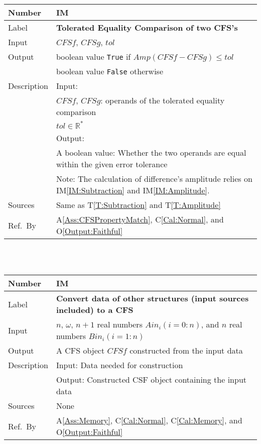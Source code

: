 \documentclass[12pt]{article}
\newcommand{\colAwidth}{0.13\textwidth}
\newcommand{\colBwidth}{0.82\textwidth}
\newcommand{\tref}[1]{T\ref{#1}}
\newcommand{\aref}[1]{A\ref{#1}}
\newcommand{\calref}[1]{C\ref{#1}}
\newcommand{\oref}[1]{O\ref{#1}}
\newcounter{instnum} %
\newcommand{\iref}[1]{IM\ref{#1}}
\begin{document}
\noindent
\begin{minipage}{\textwidth}
	\renewcommand*{\arraystretch}{1.5}
	\begin{tabular}{| p{\colAwidth} | p{\colBwidth}|}
		\hline
		\rowcolor[gray]{0.9}
		Number& IM{instnum}\theinstnum \label{IM:ToleratedEquality}\\
		\hline
		Label& \bf Tolerated Equality Comparison of two CFS's \\
		\hline
		Input& $\mathit{CFSf}$, $\mathit{CFSg}$, $\mathit{tol}$\\
		\hline
		Output& boolean value \texttt{True} if $\mathit{Amp}(\mathit{CFSf}-\mathit{CFSg})\leq \mathit{tol}$\\
		&boolean value \texttt{False} otherwise\\
		\hline
		Description&Input:\\
		&$\mathit{CFSf}$, $\mathit{CFSg}$: operands of the tolerated equality comparison\\
		&$\mathit{tol}\in\mathbb{R}^{*}$\\
		&Output:\\
		& A boolean value: Whether the two operands are equal within the given error tolerance\\
		&Note: The calculation of difference's amplitude relies on \iref{IM:Subtraction} and \iref{IM:Amplitude}.\\
		\hline
		Sources&Same as \tref{T:Subtraction} and \tref{T:Amplitude}\\
		\hline
		Ref.\ By & \aref{Ass:CFSPropertyMatch}, \calref{Cal:Normal}, and \oref{Output:Faithful}\\
		\hline
	\end{tabular}
\end{minipage}\\
~\newline

\noindent
\begin{minipage}{\textwidth}
	\renewcommand*{\arraystretch}{1.5}
	\begin{tabular}{| p{\colAwidth} | p{\colBwidth}|}
		\hline
		\rowcolor[gray]{0.9}
		Number& IM{instnum}\theinstnum \label{IM:ConvertTo}\\
		\hline
		Label& \bf Convert data of other structures (input sources included) to a CFS \\
		\hline
		Input& $n$, $\omega$, $n+1$ real numbers $\mathit{Ain}_{i} (i=0:n)$, and $n$ real numbers $\mathit{Bin}_{i} (i=1:n)$\\
		\hline
		Output& A CFS object $\mathit{CFSf}$ constructed from the input data\\
		\hline
		Description&Input: Data needed for construction\\
		&Output: Constructed CSF object containing the input data\\
		\hline
		Sources&None		\\
		\hline
		Ref.\ By &  \aref{Ass:Memory}, \calref{Cal:Normal}, \calref{Cal:Memory}, and \oref{Output:Faithful}\\
		\hline
	\end{tabular}
\end{minipage}\\
~\newline
\end{document}
